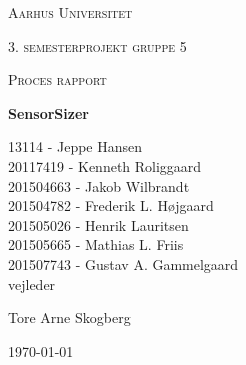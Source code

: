 \thispagestyle{empty}
	{\centering
	{\scshape\LARGE Aarhus Universitet \par}
	\vspace{1cm}
	{\scshape\Large 3. semesterprojekt gruppe 5\par}
	{\scshape\Large Proces rapport\par}
	\vspace{1.5cm}
	{\huge\bfseries SensorSizer\par}
	\vspace{2cm}
	{\Large
	13114 - Jeppe Hansen\\ 
	20117419 - Kenneth Roliggaard\\
	201504663 - Jakob Wilbrandt\\ 
	201504782 - Frederik L. Højgaard\\ 
	201505026 - Henrik Lauritsen\\ 
	201505665 - Mathias L. Friis\\ 
	201507743 - Gustav A. Gammelgaard\\}
	\vfill
	vejleder\par
	Tore Arne Skogberg

	\vfill

	{\large \today\par}
\par}

